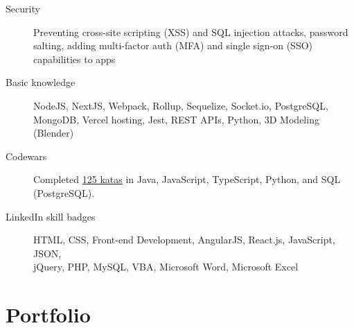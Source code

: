 \documentclass{article}
\begin{document}
\begin{description}
  \item [Security] Preventing cross-site scripting (XSS) and SQL injection attacks, password salting, adding multi-factor auth (MFA) and single sign-on (SSO) capabilities to apps
  \item [Basic knowledge] NodeJS, NextJS, Webpack, Rollup, Sequelize, Socket.io, PostgreSQL, MongoDB, Vercel hosting, Jest, REST APIs, Python, 3D Modeling (Blender)
  \item [Codewars] Completed \href{https://www.codewars.com/users/sirkoik}{125 katas} in Java, JavaScript, TypeScript, Python, and SQL (PostgreSQL).
  \item [LinkedIn skill badges] HTML, CSS, Front-end Development, AngularJS, React.js, JavaScript, JSON,\\ jQuery, PHP, MySQL, VBA, Microsoft Word, Microsoft Excel
\end{description}

\vspace{-0.5em}
\section*{Portfolio}\vspace{-0.5em}
\end{document}
